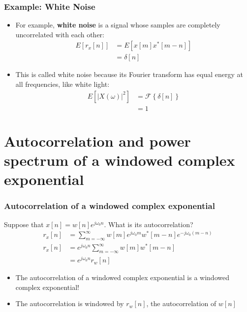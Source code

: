\documentclass{beamer}
\begin{document}
\begin{frame}
  \frametitle{Example: White Noise}

  \begin{itemize}
  \item For example, \textbf{white noise} is a signal whose samples
    are completely uncorrelated with each other:
    \begin{align*}
      E\left[r_x[n]\right] &= E\left[x[m]x^*[m-n]\right]\\
      &= \delta[n]
    \end{align*}
  \item This is called white noise because its Fourier transform has
    equal energy at all frequencies, like white light:
    \begin{align*}
      E\left[|X(\omega)|^2\right] &=
      \mathcal{F}\left\{\delta[n]\right\}\\ &= 1
    \end{align*}
  \end{itemize}
\end{frame}

\section[Exponential]{Autocorrelation and power spectrum of a windowed complex exponential}

\begin{frame}
  \frametitle{Autocorrelation of a windowed complex exponential}

  Suppose that $x[n]=w[n]e^{j\omega_0 n}$.  
  What is its autocorrelation?
  \begin{align*}
    r_x[n] &= \sum_{m=-\infty}^\infty w[m]e^{j\omega_0 m}w^*[m-n]e^{-j\omega_0(m-n)}\\
    r_x[n] &= e^{j\omega_0 n}\sum_{m=-\infty}^\infty w[m]w^*[m-n]\\
    &= e^{j\omega_0 n} r_w[n]
  \end{align*}
  \begin{itemize}
    \item The autocorrelation of a windowed complex exponential is a
      windowed complex exponential!
    \item The autocorrelation is windowed by $r_w[n]$, the
      autocorrelation of $w[n]$
  \end{itemize}
\end{frame}
\end{document}
